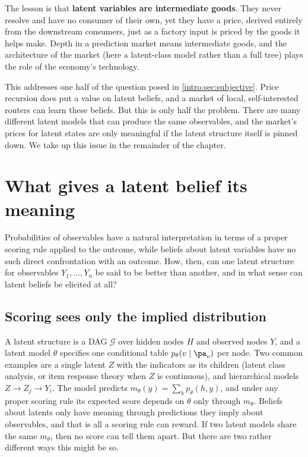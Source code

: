 \begin{draftblock}
The lesson is that \textbf{latent variables are intermediate goods}. They never resolve and have no consumer of their own, yet they have a price, derived entirely from the downstream consumers, just as a factory input is priced by the goods it helps make. Depth in a prediction market means intermediate goods, and the architecture of the market (here a latent-class model rather than a full tree) plays the role of the economy's technology.

This addresses one half of the question posed in \cref{intro:sec:subjective}. Price recursion does put a value on latent beliefs, and a market of local, self-interested routers can learn these beliefs. But this is only half the problem. There are many different latent models that can produce the same observables, and the market's prices for latent states are only meaningful if the latent structure itself is pinned down. We take up this issue in the remainder of the chapter.

\section{What gives a latent belief its meaning}\label{arb:sec:meaning}

Probabilities of observables have a natural interpretation in terms of a proper scoring rule applied to the outcome, while beliefs about latent variables have no such direct confrontation with an outcome. How, then, can one latent structure for observables $Y_1,\dots,Y_n$ be said to be better than another, and in what sense can latent beliefs be elicited at all?

\subsection{Scoring sees only the implied distribution}\label{arb:sec:gauge}

A latent structure is a DAG $\mathcal G$ over hidden nodes $H$ and observed nodes $Y$, and a latent model $\theta$ specifies one conditional table $p_\theta(v\mid\pa_v)$ per node. Two common examples are a single latent $Z$ with the indicators as its children (latent class analysis, or item response theory when $Z$ is continuous), and hierarchical models $Z\to Z_j\to Y_i$. The model predicts $m_\theta(y)=\sum_hp_\theta(h,y)$, and under any proper scoring rule its expected score depends on $\theta$ only through $m_\theta$. Beliefs about latents only have meaning through predictions they imply about observables, and that is all a scoring rule can reward. If two latent models share the same $m_\theta$, then no score can tell them apart. But there are two rather different ways this might be so.


\end{draftblock}
